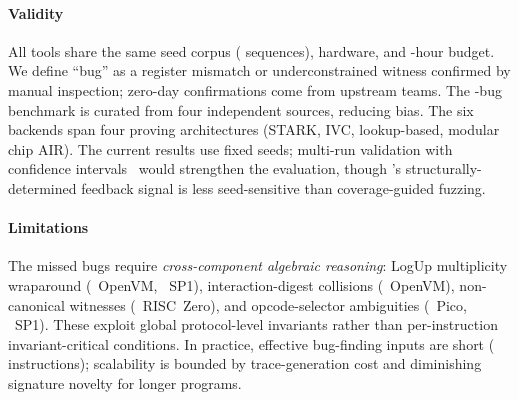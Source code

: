 
\paragraph{Validity}
All tools share the same seed corpus (  sequences), hardware, and -hour budget. We define ``bug'' as a register mismatch or underconstrained witness confirmed by manual inspection; zero-day confirmations come from upstream teams. The -bug benchmark is curated from four independent sources, reducing bias. The six backends span four proving architectures (STARK, IVC, lookup-based, modular chip AIR). The current results use fixed seeds; multi-run validation with confidence intervals~\cite{klees2018evaluating} would strengthen the evaluation, though \tool's structurally-determined feedback signal is less seed-sensitive than coverage-guided fuzzing.


\paragraph{Limitations}
The  missed bugs require \emph{cross-component algebraic reasoning}: LogUp multiplicity wraparound (~OpenVM, ~SP1), interaction-digest collisions (~OpenVM), non-canonical witnesses (~RISC~Zero), and opcode-selector ambiguities (~Pico, ~SP1). These exploit global protocol-level invariants rather than per-instruction invariant-critical conditions. In practice, effective bug-finding inputs are short ( instructions); scalability is bounded by trace-generation cost and diminishing signature novelty for longer programs.
